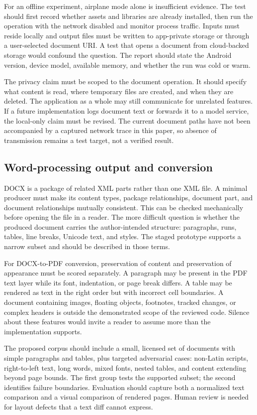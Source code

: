\documentclass[10pt,letterpaper]{article}
\begin{document}
For an offline experiment, airplane mode alone is insufficient evidence. The test should first record whether assets and libraries are already installed, then run the operation with the network disabled and monitor process traffic. Inputs must reside locally and output files must be written to app-private storage or through a user-selected document URI. A test that opens a document from cloud-backed storage would confound the question. The report should state the Android version, device model, available memory, and whether the run was cold or warm.

The privacy claim must be scoped to the document operation. It should specify what content is read, where temporary files are created, and when they are deleted. The application as a whole may still communicate for unrelated features. If a future implementation logs document text or forwards it to a model service, the local-only claim must be revised. The current document paths have not been accompanied by a captured network trace in this paper, so absence of transmission remains a test target, not a verified result.

\subsection{Word-processing output and conversion}

DOCX is a package of related XML parts rather than one XML file. A minimal producer must make its content types, package relationships, document part, and document relationships mutually consistent. This can be checked mechanically before opening the file in a reader. The more difficult question is whether the produced document carries the author-intended structure: paragraphs, runs, tables, line breaks, Unicode text, and styles. The staged prototype supports a narrow subset and should be described in those terms.

For DOCX-to-PDF conversion, preservation of content and preservation of appearance must be scored separately. A paragraph may be present in the PDF text layer while its font, indentation, or page break differs. A table may be rendered as text in the right order but with incorrect cell boundaries. A document containing images, floating objects, footnotes, tracked changes, or complex headers is outside the demonstrated scope of the reviewed code. Silence about these features would invite a reader to assume more than the implementation supports.

The proposed corpus should include a small, licensed set of documents with simple paragraphs and tables, plus targeted adversarial cases: non-Latin scripts, right-to-left text, long words, mixed fonts, nested tables, and content extending beyond page bounds. The first group tests the supported subset; the second identifies failure boundaries. Evaluation should capture both a normalized text comparison and a visual comparison of rendered pages. Human review is needed for layout defects that a text diff cannot express.
\end{document}
